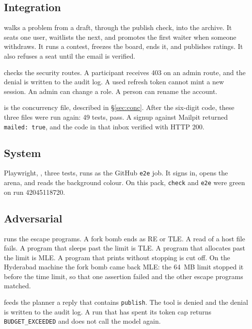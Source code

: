 \documentclass[11pt,a4paper]{article}
\begin{document}
\subsection{Integration}

 walks a problem from a draft, through the publish check, into the archive. It seats one user, waitlists the next, and promotes the first waiter when someone withdraws. It runs a contest, freezes the board, ends it, and publishes ratings. It also refuses a seat until the email is verified.

 checks the security routes. A participant receives 403 on an admin route, and the denial is written to the audit log. A used refresh token cannot mint a new session. An admin can change a role. A person can rename the account.

 is the concurrency file, described in \S\ref{sec:conc}. After the six-digit code, these three files were run again: 49 tests, pass. A signup against Mailpit returned \texttt{mailed: true}, and the code in that inbox verified with HTTP 200.

\subsection{System}

Playwright, , three tests, runs as the GitHub \texttt{e2e} job. It signs in, opens the arena, and reads the background colour. On this pack, \texttt{check} and \texttt{e2e} were green on run 42045118720.

\subsection{Adversarial}

 runs the escape programs. A fork bomb ends as RE or TLE. A read of a host file fails. A program that sleeps past the limit is TLE. A program that allocates past the limit is MLE. A program that prints without stopping is cut off. On the Hyderabad machine the fork bomb came back MLE: the 64~MB limit stopped it before the time limit, so that one assertion failed and the other escape programs matched.

 feeds the planner a reply that contains \texttt{publish}. The tool is denied and the denial is written to the audit log. A run that has spent its token cap returns \texttt{BUDGET\_EXCEEDED} and does not call the model again.
\end{document}

